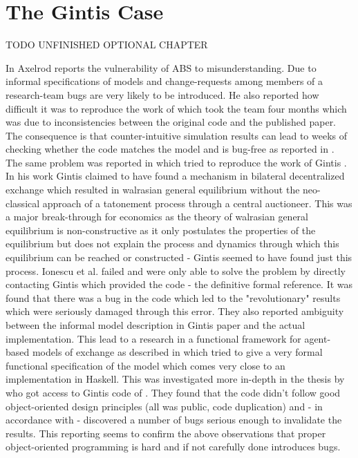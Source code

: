 \chapter{The Gintis Case}
\label{ch:gintis_case}
TODO UNFINISHED OPTIONAL CHAPTER

In \cite{axelrod_chapter_2006} Axelrod reports the vulnerability of ABS to misunderstanding. Due to informal specifications of models and change-requests among members of a research-team bugs are very likely to be introduced. He also reported how difficult it was to reproduce the work of \cite{axelrod_convergence_1995} which took the team four months which was due to inconsistencies between the original code and the published paper. The consequence is that counter-intuitive simulation results can lead to weeks of checking whether the code matches the model and is bug-free as reported in \cite{axelrod_advancing_1997}.
The same problem was reported in \cite{ionescu_dependently-typed_2012} which tried to reproduce the work of Gintis \cite{gintis_emergence_2006}. In his work Gintis claimed to have found a mechanism in bilateral decentralized exchange which resulted in walrasian general equilibrium without the neo-classical approach of a tatonement process through a central auctioneer. This was a major break-through for economics as the theory of walrasian general equilibrium is non-constructive as it only postulates the properties of the equilibrium \cite{colell_microeconomic_1995} but does not explain the process and dynamics through which this equilibrium can be reached or constructed - Gintis seemed to have found just this process. Ionescu et al. \cite{ionescu_dependently-typed_2012} failed and were only able to solve the problem by directly contacting Gintis which provided the code - the definitive formal reference. It was found that there was a bug in the code which led to the "revolutionary" results which were seriously damaged through this error. They also reported ambiguity between the informal model description in Gintis paper and the actual implementation.
This lead to a research in a functional framework for agent-based models of exchange as described in \cite{botta_functional_2011} which tried to give a very formal functional specification of the model which comes very close to an implementation in Haskell.
This was investigated more in-depth in the thesis by \cite{evensen_extensible_2010} who got access to Gintis code of \cite{gintis_emergence_2006}. They found that the code didn't follow good object-oriented design principles (all was public, code duplication) and - in accordance with \cite{ionescu_dependently-typed_2012} - discovered a number of bugs serious enough to invalidate the results. This reporting seems to confirm the above observations that proper object-oriented programming is hard and if not carefully done introduces bugs.
